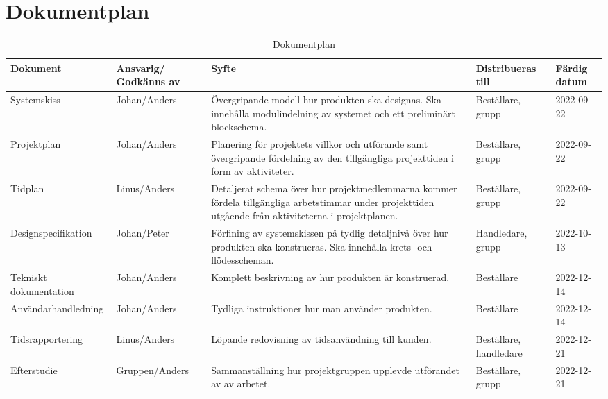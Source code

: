\documentclass[10pt,oneside,swedish]{lips}
\begin{document}
\section{Dokumentplan}
\begin{table}[htbp]
  \centering
  \caption{Dokumentplan}
  \label{tab:doks}
  \begin{tabular}{| l | p{2.2cm} | p{5cm} | p{2cm} | l |}
    \hline
      {\bfseries Dokument} & 
      {\bfseries Ansvarig/ Godkänns av} & 
      {\bfseries Syfte} & 
      {\bfseries Distribueras till} & 
      {\bfseries Färdig datum} \\
      \hline
      \hline
      Systemskiss & Johan/Anders & 
      Övergripande modell hur produkten ska
      designas. Ska innehålla modulindelning av
      systemet och ett preliminärt blockschema. 
      & Beställare, grupp & 2022-09-22 \\
      \hline
      Projektplan & Johan/Anders & 
      Planering för projektets villkor och
      utförande samt övergripande fördelning av
      den tillgängliga projekttiden i form av
      aktiviteter.
      & Beställare, grupp & 2022-09-22 \\
      \hline
      Tidplan & Linus/Anders & 
      Detaljerat schema över hur
      projektmedlemmarna kommer fördela
      tillgängliga arbetstimmar under
      projekttiden utgående från aktiviteterna i
      projektplanen.
      & Beställare, grupp & 2022-09-22 \\
      \hline
      Designspecifikation & Johan/Peter & 
      Förfining av systemskissen på tydlig
      detaljnivå över hur produkten ska
      konstrueras. Ska innehålla krets- och
      flödesscheman.
      & Handledare, grupp & 2022-10-13 \\
      \hline
      Tekniskt dokumentation & Johan/Anders & 
      Komplett beskrivning av hur produkten är konstruerad.
      & Beställare & 2022-12-14 \\
      \hline
      Användarhandledning & Johan/Anders & 
      Tydliga instruktioner hur man använder produkten.
      & Beställare & 2022-12-14 \\
      \hline
      Tidsrapportering & Linus/Anders & 
      Löpande redovisning av tidsanvändning till kunden.
      & Beställare, handledare & 2022-12-21 \\
      \hline
      Efterstudie & Gruppen/Anders & 
      Sammanställning hur projektgruppen upplevde utförandet av av arbetet.
      & Beställare, grupp & 2022-12-21 \\
      \hline
    \end{tabular}
\end{table}
\end{document}
